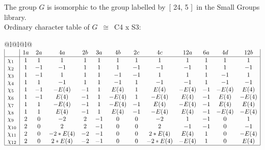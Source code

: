 \documentclass[varwidth=\maxdimen,border=10]{standalone}
\begin{document}
The group $G$ is isomorphic to the group labelled by\ [ 24, 5 ]\ in the Small Groups library.\\
Ordinary character table of $G$\ $\cong$\ C4 x S3:\\
\begin{center}
\begin{tabular}{@{}l@{}l@{}l@{}}
\hline
\(\begin{array}{|l|cccccccccccc|}
  & 1a & 2a & 4a & 2b & 3a & 4b & 2c & 4c & 12a & 6a & 4d & 12b\\ \hline
\chi_{1} & 1 & 1 & 1 & 1 & 1 & 1 & 1 & 1 & 1 & 1 & 1 & 1\\
\chi_{2} & 1 & -1 & -1 & 1 & 1 & 1 & -1 & -1 & -1 & 1 & 1 & -1\\
\chi_{3} & 1 & -1 & 1 & 1 & 1 & -1 & -1 & 1 & 1 & 1 & -1 & 1\\
\chi_{4} & 1 & 1 & -1 & 1 & 1 & -1 & 1 & -1 & -1 & 1 & -1 & -1\\
\chi_{5} & 1 & -1 & -E(4) & -1 & 1 & E(4) & 1 & E(4) & -E(4) & -1 & -E(4) & E(4)\\
\chi_{6} & 1 & -1 & E(4) & -1 & 1 & -E(4) & 1 & -E(4) & E(4) & -1 & E(4) & -E(4)\\
\chi_{7} & 1 & 1 & -E(4) & -1 & 1 & -E(4) & -1 & E(4) & -E(4) & -1 & E(4) & E(4)\\
\chi_{8} & 1 & 1 & E(4) & -1 & 1 & E(4) & -1 & -E(4) & E(4) & -1 & -E(4) & -E(4)\\
\chi_{9} & 2 & 0 & -2 & 2 & -1 & 0 & 0 & -2 & 1 & -1 & 0 & 1\\
\chi_{10} & 2 & 0 & 2 & 2 & -1 & 0 & 0 & 2 & -1 & -1 & 0 & -1\\
\chi_{11} & 2 & 0 & -2*E(4) & -2 & -1 & 0 & 0 & 2*E(4) & E(4) & 1 & 0 & -E(4)\\
\chi_{12} & 2 & 0 & 2*E(4) & -2 & -1 & 0 & 0 & -2*E(4) & -E(4) & 1 & 0 & E(4)\\
\hline
\end{array}\)\\
\end{tabular}
\end{center}
\end{document}
